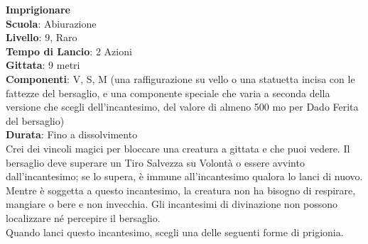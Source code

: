 \begin{multicols}{2}
\medskip\textbf{Imprigionare}\\
\textbf{Scuola}: Abiurazione\\
\textbf{Livello}: 9, Raro\\
\textbf{Tempo di Lancio}: 2 Azioni\\
\textbf{Gittata}: 9 metri\\
\textbf{Componenti}: V, S, M (una raffigurazione su vello o una statuetta incisa con le fattezze del bersaglio, e una componente speciale che varia a seconda della versione che scegli dell'incantesimo, del valore di almeno 500 mo per Dado Ferita del bersaglio)\\
\textbf{Durata}: Fino a dissolvimento\\
Crei dei vincoli magici per bloccare una creatura a gittata e che puoi vedere. Il bersaglio deve superare un Tiro Salvezza su Volontà o essere avvinto dall'incantesimo; se lo supera, è immune all'incantesimo qualora lo lanci di nuovo. Mentre è soggetta a questo incantesimo, la creatura non ha bisogno di respirare, mangiare o bere e non invecchia. Gli incantesimi di divinazione non possono localizzare né percepire il bersaglio.\\
Quando lanci questo incantesimo, scegli una delle seguenti forme di prigionia.\\


\end{multicols}
